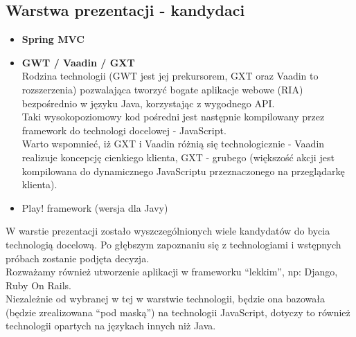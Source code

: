 \documentclass[a4paper,12pt,notitlepage]{mwrep}
\begin{document}
\subsection{Warstwa prezentacji - kandydaci}
\begin{itemize}
	\item	\textbf{Spring MVC}
	\item	\textbf{GWT / Vaadin / GXT}\\
			Rodzina technologii (GWT jest jej prekursorem, GXT oraz Vaadin to rozszerzenia)
			pozwalająca tworzyć bogate aplikacje webowe (RIA) bezpośrednio w języku Java,
			korzystając z wygodnego API.\\
			Taki wysokopoziomowy kod pośredni jest następnie kompilowany przez framework do
			technologi docelowej - JavaScript.\\
			Warto wspomnieć, iż GXT i Vaadin różnią się technologicznie - Vaadin realizuje
			koncepcję cienkiego klienta, GXT - grubego (większość akcji jest kompilowana
			do dynamicznego JavaScriptu przeznaczonego na przeglądarkę klienta).
	\item	Play! framework (wersja dla Javy)
\end{itemize}
W warstie prezentacji zostało wyszczególnionych wiele kandydatów
do bycia technologią docelową. Po głębszym zapoznaniu się z technologiami i wstępnych próbach
zostanie podjęta decyzja.\\
Rozważamy również utworzenie aplikacji w frameworku “lekkim”, np: Django, Ruby On Rails.\\
Niezależnie od wybranej w tej w warstwie technologii, będzie ona bazowała
(będzie zrealizowana “pod maską”) na technologii JavaScript, dotyczy to również
technologii opartych na językach innych niż Java.
\end{document}
